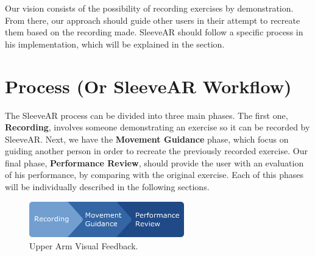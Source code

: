 Our vision consists of the possibility of recording exercises by demonstration. From there, our approach should guide other users in their attempt to recreate them based on the recording made.
SleeveAR should follow a specific process in his implementation, which will be explained in the section.







\section{Process (Or SleeveAR Workflow)}


The SleeveAR process can be divided into three main phases. 
The first one, \textbf{Recording}, involves someone demonstrating an exercise so it can be recorded by SleeveAR. 
Next, we have the \textbf{Movement Guidance} phase, which focus on guiding another person in order to recreate the previously recorded exercise.
Our final phase, \textbf{Performance Review}, should provide the user with an evaluation of his performance, by comparing with the original exercise.
Each of this phases will be individually described in the following sections.

\begin{figure}[!h]
    \begin{center}
        \includegraphics[width=0.6\textwidth]{imgs/approach/sleevear-progress}
    \end{center}
    \caption{Upper Arm Visual Feedback.}
    \label{fig:upperarmfeedback}
\end{figure}

